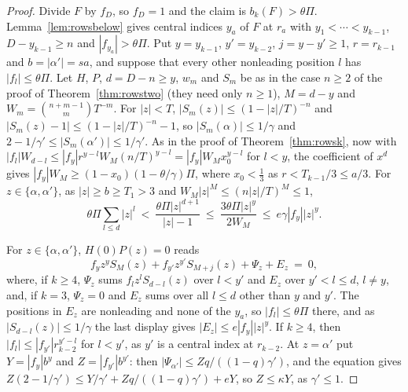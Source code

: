 \documentclass[11pt]{article}
\begin{document}
\begin{proof}
Divide $F$ by $f_D$, so $f_D=1$ and the claim is $b_k(F)>\theta\Pi$.
Lemma~\ref{lem:rowsbelow} gives central indices $y_a$ of $F$ at $r_a$ with
$y_1<\cdots<y_{k-1}$, $D-y_{k-1}\ge n$ and $|f_{y_a}|>\theta\Pi$.  Put
$y=y_{k-1}$, $y'=y_{k-2}$, $j=y-y'\ge1$, $r=r_{k-1}$ and $b=|\alpha'|=sa$,
and suppose that every other nonleading position $l$ has $|f_l|\le\theta\Pi$.
Let $H$, $P$, $d=D-n\ge y$, $w_m$ and $S_m$ be as in the case $n\ge2$ of the
proof of Theorem~\ref{thm:rowstwo} (they need only $n\ge1$), $M=d-y$ and
$W_m=\binom{n+m-1}mT^{-m}$.  For $|z|<T$, $|S_m(z)|\le(1-|z|/T)^{-n}$ and
$|S_m(z)-1|\le(1-|z|/T)^{-n}-1$, so $|S_m(\alpha)|\le1/\gamma$ and
$2-1/\gamma'\le|S_m(\alpha')|\le1/\gamma'$.  As in the proof of
Theorem~\ref{thm:rowsk}, now with
$|f_l|W_{d-l}\le|f_y|r^{y-l}W_M(n/T)^{y-l}=|f_y|W_Mx_0^{y-l}$ for $l<y$, the
coefficient of $x^d$ gives $|f_y|W_M\ge(1-x_0)(1-\theta/\gamma)\Pi$, where
$x_0<\frac13$ as $r<T_{k-1}/3\le a/3$.  For
$z\in\{\alpha,\alpha'\}$, as $|z|\ge b\ge T_1>3$ and $W_M|z|^M\le(n|z|/T)^M\le1$,
\[
  \theta\Pi\sum_{l\le d}|z|^l\ <\ \frac{\theta\Pi|z|^{d+1}}{|z|-1}
  \ \le\ \frac{3\theta\Pi|z|^y}{2W_M}\ \le\ e\gamma|f_y||z|^y .
\]

For $z\in\{\alpha,\alpha'\}$, $H(0)P(z)=0$ reads
\[
  f_yz^yS_M(z)+f_{y'}z^{y'}S_{M+j}(z)+\Psi_z+E_z\ =\ 0,
\]
where, if $k\ge4$, $\Psi_z$ sums $f_lz^lS_{d-l}(z)$ over $l<y'$ and $E_z$
over $y'<l\le d$, $l\ne y$, and, if $k=3$, $\Psi_z=0$ and $E_z$ sums over
all $l\le d$ other than $y$ and $y'$.  The positions in $E_z$ are nonleading
and none of the $y_a$, so $|f_l|\le\theta\Pi$ there, and as
$|S_{d-l}(z)|\le1/\gamma$ the last display gives $|E_z|\le e|f_y||z|^y$.  If $k\ge4$, then $|f_l|\le|f_{y'}|r_{k-2}^{y'-l}$
for $l<y'$, as $y'$ is a central index at $r_{k-2}$.  At $z=\alpha'$ put
$Y=|f_y|b^y$ and $Z=|f_{y'}|b^{y'}$: then $|\Psi_{\alpha'}|\le
Zq/((1-q)\gamma')$, and the equation gives
$Z(2-1/\gamma')\le Y/\gamma'+Zq/((1-q)\gamma')+eY$, so $Z\le\kappa Y$, as
$\gamma'\le1$.


\end{proof}
\end{document}
